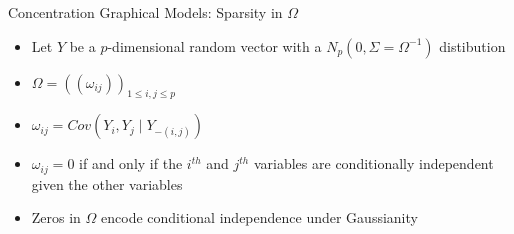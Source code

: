\documentclass[xcolor=dvipsnames,aspectratio=1610]{beamer}
\newcommand\independent{\protect\mathpalette{\protect\independenT}{\perp}}
\def\independenT#1#2{\mathrel{\rlap{$#1#2$}\mkern2mu{#1#2}}}
\theoremstyle{remark}
\begin{document}
\begin{frame}{Concentration Graphical Models: Sparsity in $\Omega$}
  \begin{itemize}
    \setlength{\itemsep}{16pt}
  \item Let $Y$ be a $p$-dimensional random vector with a $N_p ( 0, \Sigma = 
  \Omega^{-1})$ distibution 
  \item $\Omega = ((\omega_{ij}))_{1 \leq i,j \leq p}$ 
  \item $\omega_{ij} = Cov(Y_i, Y_j \mid {Y}_{-(i,j)})$ 
  \item $\omega_{ij} = 0$ if and only if the $i^{th}$ and 
  $j^{th}$ variables are conditionally independent given the other variables 
  \item Zeros in $\Omega$ encode conditional independence under Gaussianity 
  \end{itemize}
\end{frame}
\end{document}
